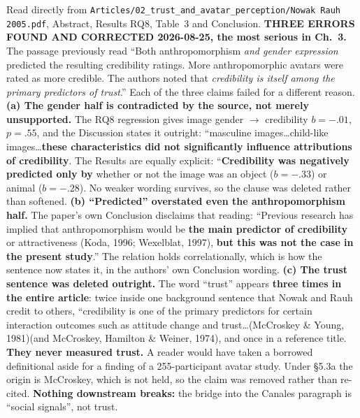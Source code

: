 \documentclass[11pt, a4paper]{article}
\begin{document}
\begin{Form}
  {Read directly from \texttt{\footnotesize Articles/02\_trust\_and\_avatar\_perception/Nowak Rauh 2005.pdf}, Abstract, Results RQ8, Table~3 and Conclusion. \textbf{THREE ERRORS FOUND AND CORRECTED 2026-08-25, the most serious in Ch.~3.} The passage previously read ``Both anthropomorphism \emph{and gender expression} predicted the resulting credibility ratings. More anthropomorphic avatars were rated as more credible. The authors noted that \emph{credibility is itself among the primary predictors of trust}.'' Each of the three claims failed for a different reason. \textbf{(a) The gender half is contradicted by the source, not merely unsupported.} The RQ8 regression gives image gender $\to$ credibility $b = -.01$, $p = .55$, and the Discussion states it outright: ``masculine images\ldots child-like images\ldots \textbf{these characteristics did not significantly influence attributions of credibility}. The Results are equally explicit: ``\textbf{Credibility was negatively predicted only by} whether or not the image was an object ($b = -.33$) or animal ($b = -.28$). No weaker wording survives, so the clause was deleted rather than softened. \textbf{(b) ``Predicted'' overstated even the anthropomorphism half.} The paper's own Conclusion disclaims that reading: ``Previous research has implied that anthropomorphism would be \textbf{the main predictor of credibility} or attractiveness (Koda, 1996; Wexelblat, 1997), \textbf{but this was not the case in the present study}.'' The relation holds correlationally, which is how the sentence now states it, in the authors' own Conclusion wording. \textbf{(c) The trust sentence was deleted outright.} The word ``trust'' appears \textbf{three times in the entire article}: twice inside one background sentence that Nowak and Rauh credit to others, ``credibility is one of the primary predictors for certain interaction outcomes such as attitude change and trust\ldots (McCroskey \& Young, 1981)(and McCroskey, Hamilton \& Weiner, 1974), and once in a reference title. \textbf{They never measured trust.} A reader would have taken a borrowed definitional aside for a finding of a 255-participant avatar study. Under \S5.3a the origin is McCroskey, which is not held, so the claim was removed rather than re-cited. \textbf{Nothing downstream breaks:} the bridge into the Canales paragraph is ``social signals'', not trust.}


\end{Form}
\end{document}
